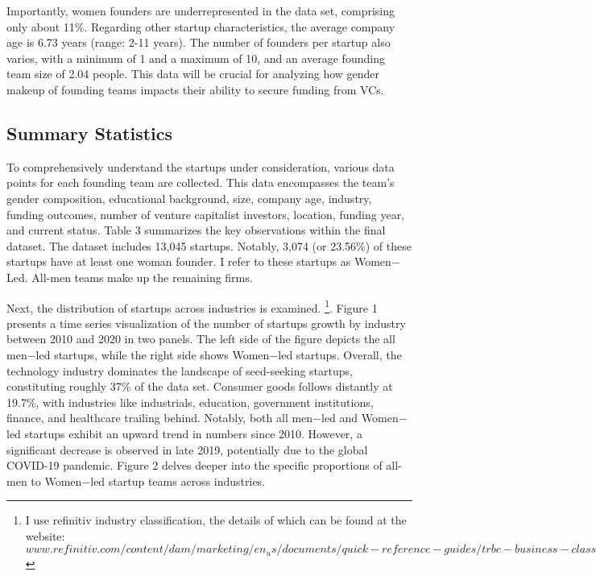 Importantly, women founders are underrepresented in the data set, comprising only about 11\%.  Regarding other startup characteristics, the average company age is 6.73 years (range: 2-11 years). The number of founders per startup also varies, with a minimum of 1 and a maximum of 10, and an average founding team size of 2.04 people.  This data will be crucial for analyzing how gender makeup of founding teams impacts their ability to secure funding from VCs.

\begin{table}[H]
 \captionsetup{justification=raggedright,singlelinecheck=false}
    \caption{Summary Statistics: Companies}
        
\end{table}


\subsection{Summary Statistics}

\hspace  *{0mm} To comprehensively understand the startups under consideration, various data points for each founding team are collected. This data encompasses the team's gender composition, educational background, size, company age, industry, funding outcomes, number of venture capitalist investors, location, funding year, and current status. Table 3 summarizes the key observations within the final dataset. The dataset includes 13,045 startups. Notably, 3,074 (or 23.56\%) of these startups have at least one woman founder. I refer to these startups as Women$-$Led. All-men teams make up the remaining firms. 

\begin{table}[H]
 \captionsetup{justification=raggedright,singlelinecheck=false}
    \caption{Summary Statistics: Companies}
        
\end{table}
 
\hspace *{0mm} Next, the distribution of startups across industries is examined. \footnote[3]{I use refinitiv industry classification, the details of which can be found at the website: $www.refinitiv.com/content/dam/marketing/en_us/documents/quick-reference-guides/trbc-business-classification-quick-guide.pdf$}. Figure 1 presents a time series visualization of the number of startups growth by industry between 2010 and 2020 in two panels. The left side of the figure depicts the all men$-$led startups, while the right side shows Women$-$led startups. Overall, the technology industry dominates the landscape of seed-seeking startups, constituting roughly 37\% of the data set. Consumer goods follows distantly at 19.7\%, with industries like industrials, education, government institutions, finance, and healthcare trailing behind. Notably, both all men$-$led and Women$-$led startups exhibit an upward trend in numbers since 2010. However, a significant decrease is observed in late 2019, potentially due to the global COVID-19 pandemic. Figure 2 delves deeper into the specific proportions of all-men to Women$-$led startup teams across industries.

